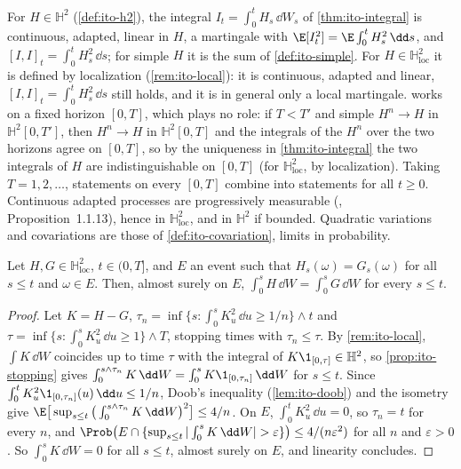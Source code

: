 \begin{remark}\label{rem:itf-standing}
For $H\in\mathbb H^2$ (\cref{def:ito-h2}), the integral $I_t=\int_0^tH_s\,\dd W_s$ of
\cref{thm:ito-integral} is continuous, adapted, linear in $H$, a martingale with
$\E[I_t^2]=\E\int_0^tH_s^2\,\dd s$, and $[I,I]_t=\int_0^tH_s^2\,\dd s$; for simple $H$ it is the
sum of \cref{def:ito-simple}. For $H\in\mathbb H^2_{\mathrm{loc}}$ it is defined by localization
(\cref{rem:ito-local}): it is continuous, adapted and linear, $[I,I]_t=\int_0^tH_s^2\,\dd s$ still
holds, and it is in general only a local martingale.  works on a fixed
horizon $[0,T]$, which plays no role: if $T<T'$ and simple $H^n\to H$ in $\mathbb H^2[0,T']$, then
$H^n\to H$ in $\mathbb H^2[0,T]$ and the integrals of the $H^n$ over the two horizons agree on
$[0,T]$, so by the uniqueness in \cref{thm:ito-integral} the two integrals of $H$ are
indistinguishable on $[0,T]$ (for $\mathbb H^2_{\mathrm{loc}}$, by localization). Taking
$T=1,2,\dots$, statements on every $[0,T]$ combine into statements for all $t\ge0$. Continuous
adapted processes are progressively measurable (\textcite{karatzas-shreve}, Proposition~1.1.13),
hence in $\mathbb H^2_{\mathrm{loc}}$, and in $\mathbb H^2$ if bounded. Quadratic variations and
covariations are those of \cref{def:ito-covariation}, limits in probability.
\end{remark}

\begin{lemma}[Locality]\label{lem:itf-local}
Let $H,G\in\mathbb H^2_{\mathrm{loc}}$, $t\in(0,T]$, and $E$ an event such that
$H_s(\omega)=G_s(\omega)$ for all $s\le t$ and $\omega\in E$. Then, almost surely on $E$,
$\int_0^sH\,\dd W=\int_0^sG\,\dd W$ for every $s\le t$.
\end{lemma}

\begin{proof}
Let $K=H-G$, $\tau_n=\inf\{s:\int_0^sK_u^2\,\dd u\ge1/n\}\wedge t$ and
$\tau=\inf\{s:\int_0^sK_u^2\,\dd u\ge1\}\wedge T$, stopping times with $\tau_n\le\tau$. By
\cref{rem:ito-local}, $\int K\,\dd W$ coincides up to time $\tau$ with the integral of
$K\1_{[0,\tau]}\in\mathbb H^2$, so \cref{prop:ito-stopping} gives
$\int_0^{s\wedge\tau_n}K\,\dd W=\int_0^sK\1_{[0,\tau_n]}\,\dd W$ for $s\le t$. Since
$\int_0^tK_u^2\1_{[0,\tau_n]}(u)\,\dd u\le1/n$, Doob's inequality (\cref{lem:ito-doob}) and the
isometry give $\E\big[\sup_{s\le t}\big(\int_0^{s\wedge\tau_n}K\,\dd W\big)^2\big]\le4/n$. On $E$,
$\int_0^tK_u^2\,\dd u=0$, so $\tau_n=t$ for every $n$, and
$\Prob\big(E\cap\{\sup_{s\le t}|\int_0^sK\,\dd W|>\varepsilon\}\big)\le4/(n\varepsilon^2)$ for all
$n$ and $\varepsilon>0$. So $\int_0^sK\,\dd W=0$ for all $s\le t$, almost surely on $E$, and
linearity concludes.
\end{proof}


